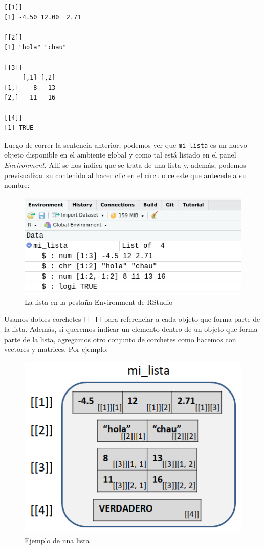 \documentclass[
]{book}
\begin{document}
\begin{verbatim}
[[1]]
[1] -4.50 12.00  2.71

[[2]]
[1] "hola" "chau"

[[3]]
     [,1] [,2]
[1,]    8   13
[2,]   11   16

[[4]]
[1] TRUE
\end{verbatim}

Luego de correr la sentencia anterior, podemos ver que \texttt{mi\_lista} es un nuevo objeto disponible en el ambiente global y como tal está listado en el panel \emph{Environment}. Allí se nos indica que se trata de una lista y, además, podemos previsualizar su contenido al hacer clic en el círculo celeste que antecede a su nombre:

\begin{figure}

{\centering \includegraphics[width=0.5\linewidth]{images/05_estructuras/lista_rstudio} 

}

\caption{La lista en la pestaña Environment de RStudio}\label{fig:unnamed-chunk-182}
\end{figure}

Usamos dobles corchetes \texttt{{[}{[}\ {]}{]}} para referenciar a cada objeto que forma parte de la lista. Además, si queremos indicar un elemento dentro de un objeto que forma parte de la lista, agregamos otro conjunto de corchetes como hacemos con vectores y matrices. Por ejemplo:

\begin{figure}

{\centering \includegraphics[width=0.5\linewidth]{images/05_estructuras/estr10} 

}

\caption{Ejemplo de una lista}\label{fig:unnamed-chunk-183}
\end{figure}
\end{document}
